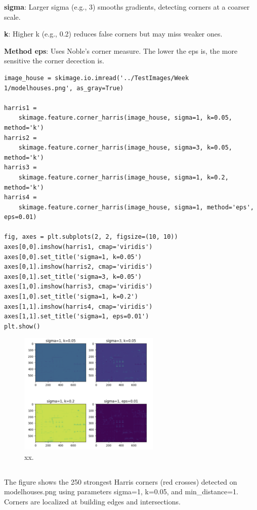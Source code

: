 \documentclass[12pt]{article}
\begin{document}
\textbf{sigma}: Larger sigma (e.g., 3) smooths gradients, detecting corners at a coarser scale.

\textbf{k}: Higher k (e.g., 0.2) reduces false corners but may miss weaker ones.

\textbf{Method eps}: Uses Noble’s corner measure. The lower the eps is, the more sensitive the corner decection is.

\begin{lstlisting}
image_house = skimage.io.imread('../TestImages/Week 1/modelhouses.png', as_gray=True)

harris1 = 
	skimage.feature.corner_harris(image_house, sigma=1, k=0.05, method='k')
harris2 = 
	skimage.feature.corner_harris(image_house, sigma=3, k=0.05, method='k')
harris3 = 
	skimage.feature.corner_harris(image_house, sigma=1, k=0.2, method='k')
harris4 = 
	skimage.feature.corner_harris(image_house, sigma=1, method='eps', eps=0.01)

fig, axes = plt.subplots(2, 2, figsize=(10, 10))
axes[0,0].imshow(harris1, cmap='viridis')
axes[0,0].set_title('sigma=1, k=0.05')
axes[0,1].imshow(harris2, cmap='viridis')
axes[0,1].set_title('sigma=3, k=0.05')
axes[1,0].imshow(harris3, cmap='viridis')
axes[1,0].set_title('sigma=1, k=0.2')
axes[1,1].imshow(harris4, cmap='viridis')
axes[1,1].set_title('sigma=1, eps=0.01')
plt.show()
\end{lstlisting}

\begin{figure}[h]
    \centering
    \includegraphics[width=0.6\textwidth]{pics/a5-3.2} 
    \caption{xx.}
\end{figure}

\subsection{}

The figure shows the 250 strongest Harris corners (red crosses) detected on modelhouses.png using parameters sigma=1, k=0.05, and min\_distance=1. Corners are localized at building edges and intersections.
\end{document}
